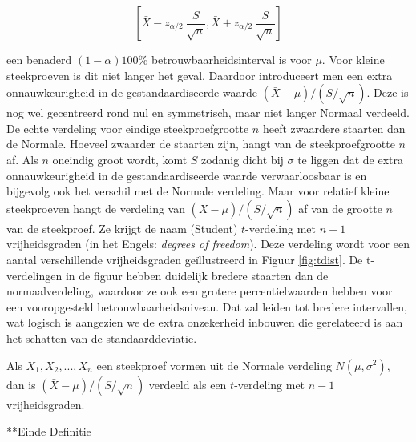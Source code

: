 \documentclass[12pt,dutch,coursenotes]{book}
\theoremstyle{definition}
\theoremstyle{definition}
\theoremstyle{definition}
\theoremstyle{remark}
\let\BeginKnitrBlock\begin \let\EndKnitrBlock\end
\begin{document}
\begin{equation*}
\left[\bar{X} - z_{\alpha/2} \ \frac{S}{\sqrt{n}} , \bar{X} + z_{\alpha/2} \ 
\frac{S}{\sqrt{n}}\right]
\end{equation*}

een benaderd \((1- \alpha)100\%\) betrouwbaarheidsinterval is voor
\(\mu\). Voor kleine steekproeven is dit niet langer het geval. Daardoor
introduceert men een extra onnauwkeurigheid in de gestandaardiseerde
waarde \({(\bar{X} - \mu)}/{(S/\sqrt{n})}\). Deze is nog wel gecentreerd
rond nul en symmetrisch, maar niet langer Normaal verdeeld. De echte
verdeling voor eindige steekproefgrootte \(n\) heeft zwaardere staarten
dan de Normale. Hoeveel zwaarder de staarten zijn, hangt van de
steekproefgrootte \(n\) af. Als \(n\) oneindig groot wordt, komt \(S\)
zodanig dicht bij \(\sigma\) te liggen dat de extra onnauwkeurigheid in
de gestandaardiseerde waarde verwaarloosbaar is en bijgevolg ook het
verschil met de Normale verdeling. Maar voor relatief kleine
steekproeven hangt de verdeling van \({(\bar{X} - \mu)}/({S/\sqrt{n}})\)
af van de grootte \(n\) van de steekproef. Ze krijgt de naam (Student)
\(t\)-verdeling met \(n-1\) vrijheidsgraden (in het Engels:
\emph{degrees of freedom}). Deze verdeling wordt voor een aantal
verschillende vrijheidsgraden geïllustreerd in Figuur \ref{fig:tdist}.
De t-verdelingen in de figuur hebben duidelijk bredere staarten dan de
normaalverdeling, waardoor ze ook een grotere percentielwaarden hebben
voor een vooropgesteld betrouwbaarheidsniveau. Dat zal leiden tot
bredere intervallen, wat logisch is aangezien we de extra onzekerheid
inbouwen die gerelateerd is aan het schatten van de standaarddeviatie.

\BeginKnitrBlock{definition}[t-verdeling]
\protect\hypertarget{def:unnamed-chunk-73}{}{\label{def:unnamed-chunk-73}
\iffalse (t-verdeling) \fi{} }Als \(X_1, X_2, ..., X_n\) een steekproef
vormen uit de Normale verdeling \(N(\mu, \sigma^2)\), dan is
\((\bar{X} - \mu)/(S/\sqrt{n})\) verdeeld als een \(t\)-verdeling met
\(n-1\) vrijheidsgraden.

**Einde Definitie
\EndKnitrBlock{definition}
\end{document}
